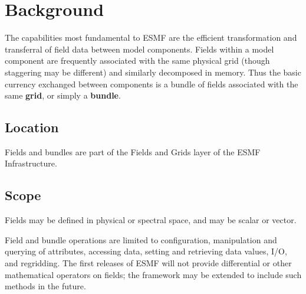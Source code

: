 
\section{Background}

The capabilities most fundamental to ESMF are the efficient transformation and 
transferral of field data between model components.  Fields within a model 
component are frequently associated with the same physical grid (though
staggering may be different) and similarly decomposed in memory.
Thus the basic currency exchanged between components is a bundle of fields 
associated with the same {\bf grid}, or simply a {\bf bundle}.  

\subsection{Location}
Fields and bundles are part of the Fields and Grids layer of the 
ESMF Infrastructure.

\subsection{Scope}

Fields may be defined in physical or spectral space, and may be scalar or 
vector. 

Field and bundle operations are limited to configuration, manipulation
and querying of attributes, accessing data, setting and retrieving data 
values, I/O, and regridding.  The first releases of ESMF will not provide 
differential or other mathematical operators on fields; the framework may 
be extended to include such methods in the future.

